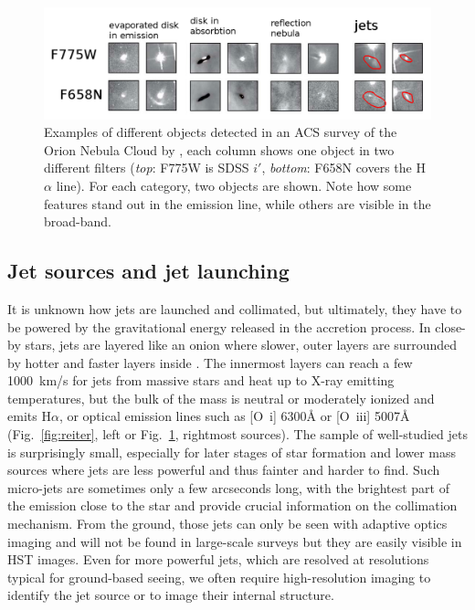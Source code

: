 \documentclass[12pt]{article}
\begin{document}
\begin{figure}
    \centering
    \includegraphics[width=\textwidth]{ONCACS.png}
    \caption{Examples of different objects detected in an ACS survey of the Orion Nebula Cloud by \citet{2008AJ....136.2136R}, each column shows one object in two different filters (\emph{top}: F775W is SDSS $i'$, \emph{bottom}: F658N covers the H$\alpha$ line). For each category, two objects are shown. Note how some features stand out in the emission line, while others are visible in the broad-band.}
    \label{fig:ONCACS}
\end{figure}

\subsection{Jet sources and jet launching}
It is unknown how jets are launched and collimated, but ultimately, they have
to be powered by the gravitational energy released in the accretion process. In
close-by stars, jets are layered like an onion where slower, outer layers are
surrounded by hotter and faster layers inside \citep{1993ApJ...409..748G,2000ApJ...537L..49B}. The
innermost layers can reach a few 1000~km/s for jets from massive stars and heat
up to X-ray emitting temperatures, but the bulk of the mass is neutral or
moderately ionized and emits H$\alpha$, or optical emission lines such as
[O~{\sc i}] 6300\AA{} or [O~{\sc iii}] 5007\AA{} (Fig.~\ref{fig:reiter},
left or Fig.~\ref{fig:ONCACS}, rightmost sources). The sample of well-studied jets is surprisingly small, especially for
later stages of star formation and lower mass sources where jets are less
powerful and thus fainter and harder to find. Such micro-jets are sometimes
only a few arcseconds long, with the brightest part of the emission close to
the star and provide crucial information on the collimation mechanism. From the ground, those jets can only be seen with adaptive optics
imaging and will not be found in large-scale surveys but they are easily
visible in HST images. Even for more powerful jets, which are resolved at
resolutions typical for ground-based seeing, we often require high-resolution
imaging to identify the jet source or to image their internal structure.
\end{document}

